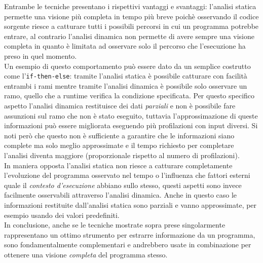 Entrambe le tecniche presentano i rispettivi vantaggi e svantaggi: l'analisi statica permette una visione più completa in tempo più breve poichè osservando il codice sorgente riesce a catturare tutti i possibili percorsi in cui un programma potrebbe entrare, al contrario l'analisi dinamica non permette di avere sempre una visione completa in quanto è limitata ad osservare solo il percorso che l'esecuzione ha preso in quel momento.\\
Un esempio di questo comportamento può essere dato da un semplice costrutto come l'\texttt{if-then-else}: tramite l'analisi statica è possibile catturare con facilità entrambi i rami mentre tramite l'analisi dinamica è possibile solo osservare un ramo, quello che a runtime verifica la condizione specificata. Per questo specifico aspetto l'analisi dinamica restituisce dei dati \emph{parziali} e non è possibile fare assunzioni sul ramo che non è stato eseguito, tuttavia l'approssimazione di queste informazioni può essere migliorata eseguendo più profilazioni con input diversi. Si noti però che questo non è sufficiente a garantire che le informazioni siano complete ma solo meglio approssimate e il tempo richiesto per completare l'analisi diventa maggiore (proporzionale rispetto al numero di profilazioni).\\
In maniera opposta l'analisi statica non riesce a catturare completamente l'evoluzione del programma osservato nel tempo o l'influenza che fattori esterni quale il \emph{contesto d'esecuzione} abbiano sullo stesso, questi aspetti sono invece facilmente osservabili attraverso l'analisi dinamica. Anche in questo caso le informazioni restituite dall'analisi statica sono parziali e vanno approssimate, per esempio usando dei valori predefiniti.\bigskip \\
In conclusione, anche se le tecniche mostrate sopra prese singolarmente rappresentano un ottimo strumento per estrarre informazione da un programma, sono fondamentalmente complementari e andrebbero usate in combinazione per ottenere una visione \emph{completa} del programma stesso.

